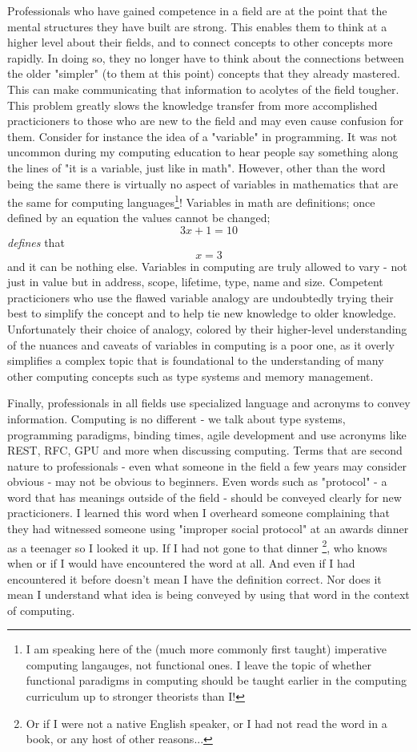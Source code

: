 \documentclass[11pt,fleqn]{book} %
\begin{document}
Professionals who have gained competence in a field are at the point that the mental structures they have built are strong.  This enables them to think at a higher level about their fields, and to connect concepts to other concepts more rapidly.  In doing so, they no longer have to think about the connections between the older "simpler" (to them at this point) concepts that they already mastered.  This can make communicating that information to acolytes of the field tougher.  This problem greatly slows the knowledge transfer from more accomplished practicioners to those who are new to the field and may even cause confusion for them.  Consider for instance the idea of a "variable" in programming.  It was not uncommon during my computing education to hear people say something along the lines of "it is a variable, just like in math".  However, other than the word being the same there is virtually no aspect of variables in mathematics that are the same for computing languages\footnote{I am speaking here of the (much more commonly first taught) imperative computing langauges, not functional ones.  I leave the topic of whether functional paradigms in computing should be taught earlier in the computing curriculum up to stronger theorists than I!}! Variables in math are definitions; once defined by an equation the values cannot be changed; \[ 3x + 1 = 10 \] \textit{defines} that \[ x = 3 \] and it can be nothing else. Variables in computing are truly allowed to vary - not just in value but in address, scope, lifetime, type, name and size.  Competent practicioners who use the flawed variable analogy are undoubtedly trying their best to simplify the concept and to help tie new knowledge to older knowledge.  Unfortunately their choice of analogy, colored by their higher-level understanding of the nuances and caveats of variables in computing is a poor one, as it overly simplifies a complex topic that is foundational to the understanding of many other computing concepts such as type systems and memory management. 

Finally, professionals in all fields use specialized language and acronyms to convey information.  Computing is no different - we talk about type systems, programming paradigms, binding times, agile development and use acronyms like REST, RFC, GPU and more when discussing computing.  Terms that are second nature to professionals - even what someone in the field a few years may consider obvious - may not be obvious to beginners.  Even words such as "protocol" - a word that has meanings outside of the field - should be conveyed clearly for new practicioners.  I learned this word when I overheard someone complaining that they had witnessed someone using "improper social protocol" at an awards dinner as a teenager so I looked it up.  If I had not gone to that dinner \footnote{Or if I were not a native English speaker, or I had not read the word in a book, or any host of other reasons...}, who knows when or if I would have encountered the word at all.  And even if I had encountered it before doesn't mean I have the definition correct.  Nor does it mean I understand what idea is being conveyed by using that word in the context of computing.
\end{document}
